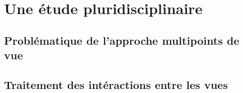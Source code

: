 \section{Une étude pluridisciplinaire}
\label{sec:introduction_contexte_multivue}

\subsection{Problématique de l'approche multipoints de vue}
\subsection{Traitement des intéractions entre les vues}


